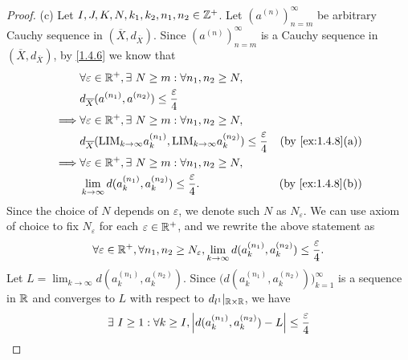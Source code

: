\begin{proof}{(c)}
  Let \(I, J, K, N, k_1, k_2, n_1, n_2 \in \mathbb{Z}^+\).
  Let \((a^{(n)})_{n = m}^\infty\) be arbitrary Cauchy sequence in \((\overline{X}, d_{\overline{X}})\).
  Since \((a^{(n)})_{n = m}^\infty\) is a Cauchy sequence in \((\overline{X}, d_{\overline{X}})\), by \cref{1.4.6} we know that
  \begin{align*}
             & \forall \varepsilon \in \R^+, \exists\ N \geq m : \forall n_1, n_2 \geq N,                                                                                 \\
             & d_{\overline{X}}(a^{(n_1)}, a^{(n_2)}) \leq \frac{\varepsilon}{4}                                                                                          \\
    \implies & \forall \varepsilon \in \R^+, \exists\ N \geq m : \forall n_1, n_2 \geq N,                                                                                 \\
             & d_{\overline{X}}(\text{LIM}_{k \to \infty} a_k^{(n_1)}, \text{LIM}_{k \to \infty} a_k^{(n_2)}) \leq \frac{\varepsilon}{4} & \text{(by \cref{ex:1.4.8}(a))} \\
    \implies & \forall \varepsilon \in \R^+, \exists\ N \geq m : \forall n_1, n_2 \geq N,                                                                                 \\
             & \lim_{k \to \infty} d(a_k^{(n_1)}, a_k^{(n_2)}) \leq \frac{\varepsilon}{4}.                                               & \text{(by \cref{ex:1.4.8}(b))}
  \end{align*}
  Since the choice of \(N\) depends on \(\varepsilon\), we denote such \(N\) as \(N_\varepsilon\).
  We can use axiom of choice to fix \(N_\varepsilon\) for each \(\varepsilon \in \mathbb{R}^+\), and we rewrite the above statement as
  \[
    \forall \varepsilon \in \mathbb{R}^+, \forall n_1, n_2 \geq N_\varepsilon, \lim_{k \to \infty} d(a_k^{(n_1)}, a_k^{(n_2)}) \leq \frac{\varepsilon}{4}.
  \]
  Let \(L = \lim_{k \to \infty} d(a_k^{(n_1)}, a_k^{(n_2)})\).
  Since \(\Big(d(a_k^{(n_1)}, a_k^{(n_2)})\Big)_{k = 1}^\infty\) is a sequence in \(\mathbb{R}\) and converges to \(L\) with respect to \(d_{l^1}|_{\mathbb{R} \times \mathbb{R}}\), we have
  \begin{align*}
             & \exists\ I \geq 1 : \forall k \geq I, \abs{d(a_k^{(n_1)}, a_k^{(n_2)}) - L} \leq \frac{\varepsilon}{4}                                                                                            \\

\end{align*}
\end{proof}
